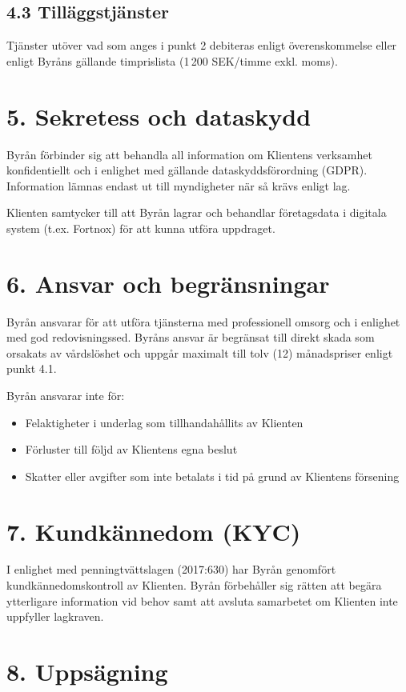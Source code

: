 \documentclass[a4paper,11pt]{article}
\begin{document}
\subsection*{4.3 Tilläggstjänster}
Tjänster utöver vad som anges i punkt 2 debiteras enligt överenskommelse eller enligt Byråns gällande timprislista (1\,200 SEK/timme exkl. moms).

\section*{5. Sekretess och dataskydd}

Byrån förbinder sig att behandla all information om Klientens verksamhet konfidentiellt och i enlighet med gällande dataskyddsförordning (GDPR). Information lämnas endast ut till myndigheter när så krävs enligt lag.

Klienten samtycker till att Byrån lagrar och behandlar företagsdata i digitala system (t.ex. Fortnox) för att kunna utföra uppdraget.

\section*{6. Ansvar och begränsningar}

Byrån ansvarar för att utföra tjänsterna med professionell omsorg och i enlighet med god redovisningssed. Byråns ansvar är begränsat till direkt skada som orsakats av vårdslöshet och uppgår maximalt till tolv (12) månadspriser enligt punkt 4.1.

Byrån ansvarar inte för:
\begin{itemize}
  \item Felaktigheter i underlag som tillhandahållits av Klienten
  \item Förluster till följd av Klientens egna beslut
  \item Skatter eller avgifter som inte betalats i tid på grund av Klientens försening
\end{itemize}

\section*{7. Kundkännedom (KYC)}

I enlighet med penningtvättslagen (2017:630) har Byrån genomfört kundkännedomskontroll av Klienten. Byrån förbehåller sig rätten att begära ytterligare information vid behov samt att avsluta samarbetet om Klienten inte uppfyller lagkraven.

\section*{8. Uppsägning}
\end{document}
